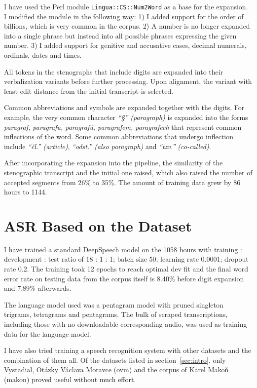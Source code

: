 \documentclass[conference]{IEEEtran}
\begin{document}
I have used the Perl module \texttt{Lingua::CS::Num2Word} as a base for the
expansion. I modified the module in the following way: 1) I added support for
the order of billions, which is very common in the corpus. 2) A number is no
longer expanded into a single phrase but instead into all possible phrases
expressing the given number. 3) I added support for genitive and accusative
cases, decimal numerals, ordinals, dates and times.

All tokens in the stenographs that include digits are expanded into their
verbalization variants before further processing. Upon alignment, the variant
with least edit distance from the initial transcript is selected.

Common abbreviations and symbols are expanded together with the digits. For
example, the very common character \textit{``§'' (paragraph)} is expanded into
the forms \textit{paragraf, paragrafu, paragrafů, paragrafem,
paragrafech} that represent common inflections of the word. Some common
abbreviations that undergo inflection include \textit{``čl.'' (article)},
\textit{``odst.'' (also paragraph)} and \textit{``tzv.'' (co-called)}.

After incorporating the expansion into the pipeline, the similarity of the
stenographic transcript and the initial one raised, which also raised the number
of accepted segments from 26\% to 35\%. The amount of training data grew by 86
hours to 1144.

\section{ASR Based on the Dataset}

I have trained a standard DeepSpeech\cite{hannun2014deep} model on the 1058
hours with training :
development : test ratio of 18 : 1 : 1; batch size 50; learning rate 0.0001; dropout
rate 0.2. The training took 12 epochs to reach optimal dev fit and the final
word error rate on testing data from the corpus itself is 8.40\% before digit
expansion and 7.89\% afterwards.

The language model used was a pentagram model with pruned singleton trigrams,
tetragrams and pentagrams. The bulk of scraped transcriptions, including those
with no downloadable corresponding audio, was used as training data for the
language model.

I have also tried training a speech recognition system with other datasets and
the combination of them all. Of the datasets listed in
section~\ref{sec:intro}, only Vystadial, Otázky Václava Moravce (ovm) and the
corpus of Karel Makoň (makon) proved useful without much effort.
\end{document}
